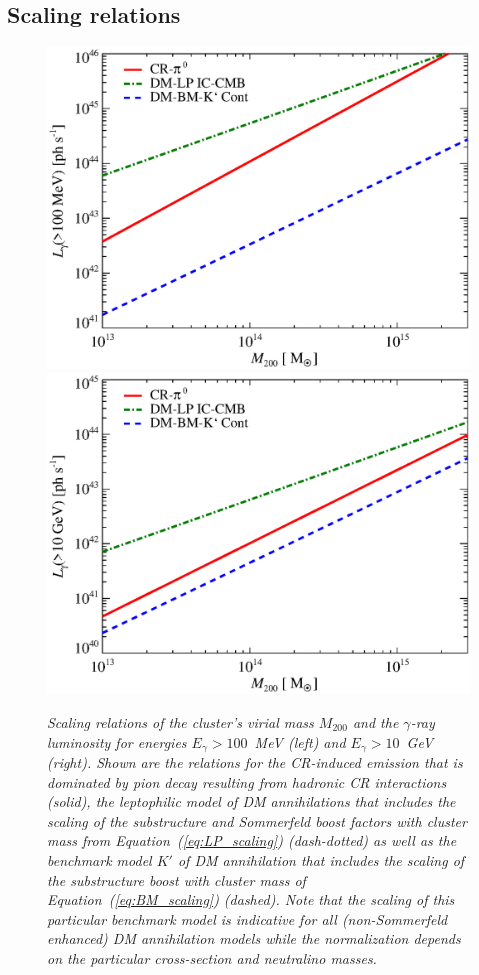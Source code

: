 \documentclass[10pt,aps,pra,reprint,amsmath,amsfonts,amssymb,showpacs]{revtex4-1}
\begin{document}
\subsection{Scaling relations}

\begin{figure}
  \includegraphics[width=0.99\columnwidth]{figures/MLscaling.100M.eps}
  \includegraphics[width=0.99\columnwidth]{figures/MLscaling.10G.eps}
  \caption{\it Scaling relations of the cluster's virial mass $M_{200}$ and the
    $\gamma$-ray luminosity for energies $E_\gamma>100$~MeV (left) and
    $E_\gamma>10$~GeV (right).  Shown are the relations for the CR-induced
    emission that is dominated by pion decay resulting from hadronic CR
    interactions (solid), the leptophilic model of DM annihilations that
    includes the scaling of the substructure and Sommerfeld boost factors with
    cluster mass from Equation~(\ref{eq:LP_scaling}) (dash-dotted) as well as the
    benchmark model $K'$ of DM annihilation that includes the scaling of the
    substructure boost with cluster mass of Equation~(\ref{eq:BM_scaling})
    (dashed). Note that the scaling of this particular benchmark model is
    indicative for all (non-Sommerfeld enhanced) DM annihilation models while
    the normalization depends on the particular cross-section and neutralino
    masses.}
\label{fig:lum_mass_scaling}
\end{figure}
\end{document}
